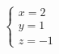 \documentclass[preview]{standalone}
\begin{document}
\begin{align*}
\begin{cases} x = 2 \\ y = 1 \\ z = -1 \end{cases}
\end{align*}
\end{document}
